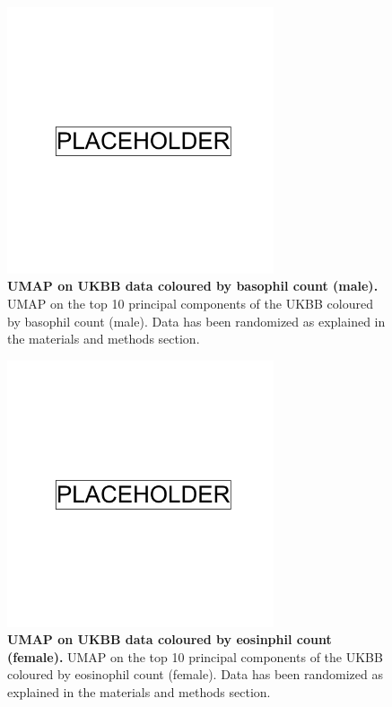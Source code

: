 \newpage

\begin{figure}[ht]
    \centering
    \includegraphics[width=0.7\textwidth]{placeholder.png}
    \caption[UMAP on UKBB data coloured by basophil count (male)]{\textbf{UMAP on UKBB data coloured by basophil count (male).} UMAP on the top 10 principal components of the UKBB coloured by basophil count (male). Data has been randomized as explained in the materials and methods section.}
    \label{fig:supp_ukbb_basophill_m}
\end{figure}

\newpage

\begin{figure}[ht]
    \centering
    \includegraphics[width=0.7\textwidth]{placeholder.png}
    \caption[UMAP on UKBB data coloured by eosinphil count (female)]{\textbf{UMAP on UKBB data coloured by eosinphil count (female).} UMAP on the top 10 principal components of the UKBB coloured by eosinophil count (female). Data has been randomized as explained in the materials and methods section.}
    \label{fig:supp_ukbb_eosinophill_f}
\end{figure}

